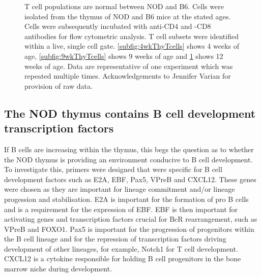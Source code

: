 \begin{figure}
\begin{subfigure}{0.5\textwidth}
	\label{subfig:12wkThyTcells}
	\end{subfigure}
\caption[Major T cell subtypes are normal in the NOD mouse thymus]{T cell populations are normal between NOD and B6. 
Cells were isolated from the thymus of NOD and B6 mice at the stated ages.
Cells were subsequently incubated with anti-CD4 and -CD8 antibodies for flow cytometric analysis.
T cell subsets were identified within a live, single cell gate.
\ref{subfig:4wkThyTcells} shows 4 weeks of age, \ref{subfig:9wkThyTcells} shows 9 weeks of age and \ref{subfig:12wkThyTcells} shows 12 weeks of age.
Data are representative of one experiment which was repeated multiple times.
Acknowledgements to Jennifer Varian for provision of raw data.}
\label{fig:NODB6Tcells}
\end{figure}


\subsection{The NOD thymus contains B cell development transcription factors}
\label{subsec:TFs}



If B cells are increasing within the thymus, this begs the question as to whether the NOD thymus is providing an environment conducive to B cell development. 
To investigate this, primers were designed that were specific for B cell development factors such as E2A, EBF, Pax5, VPreB and CXCL12.
These genes were chosen as they are important for lineage commitment and/or lineage progession and stabilisation.
E2A is important for the formation of pro B cells and is a requirement for the expression of EBF.
EBF is then important for activating genes and transcription factors crucial for BcR rearrangement, such as VPreB and FOXO1.
Pax5 is important for the progression of progenitors within the B cell lineage and for the repression of transcription factors driving development of other lineages, for example, Notch1 for T cell development.
CXCL12 is a cytokine responsible for holding B cell progenitors in the bone marrow niche during development.

